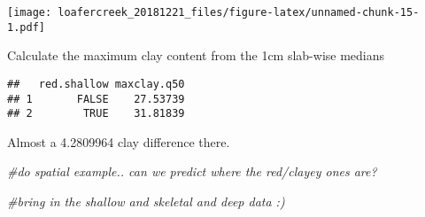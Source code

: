 \documentclass[]{article}
\newenvironment{Shaded}{\begin{snugshade}}{\end{snugshade}}
\newcommand{\KeywordTok}[1]{\textcolor[rgb]{0.13,0.29,0.53}{\textbf{#1}}}
\newcommand{\DataTypeTok}[1]{\textcolor[rgb]{0.13,0.29,0.53}{#1}}
\newcommand{\StringTok}[1]{\textcolor[rgb]{0.31,0.60,0.02}{#1}}
\newcommand{\CommentTok}[1]{\textcolor[rgb]{0.56,0.35,0.01}{\textit{#1}}}
\newcommand{\OperatorTok}[1]{\textcolor[rgb]{0.81,0.36,0.00}{\textbf{#1}}}
\newcommand{\NormalTok}[1]{#1}
\begin{document}
\texttt{[image: loafercreek\_20181221\_files/figure-latex/unnamed-chunk-15-1.pdf]}

Calculate the maximum clay content from the 1cm slab-wise medians

\begin{Shaded}
\end{Shaded}

\begin{verbatim}
##   red.shallow maxclay.q50
## 1       FALSE    27.53739
## 2        TRUE    31.81839
\end{verbatim}

Almost a 4.2809964 clay difference there.

\begin{Shaded}
\begin{Highlighting}[]
\CommentTok{#do spatial example.. can we predict where the red/clayey ones are?}
\end{Highlighting}
\end{Shaded}

\begin{Shaded}
\begin{Highlighting}[]
\CommentTok{#bring in the shallow and skeletal and deep data :)}
\end{Highlighting}
\end{Shaded}
\end{document}
